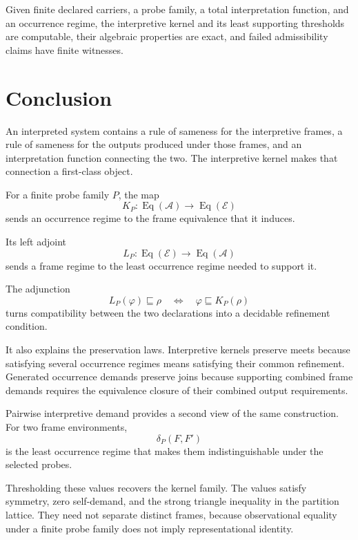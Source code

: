 \documentclass[11pt]{article}
\theoremstyle{plain}
\theoremstyle{definition}
\theoremstyle{remark}
\begin{document}
Given finite declared carriers, a probe family,
a total interpretation function,
and an occurrence regime,
the interpretive kernel
and its least supporting thresholds
are computable, their algebraic properties are exact,
and failed admissibility claims have finite witnesses.

\section{Conclusion}
\label{ik.sec.conclusion}

An interpreted system contains a rule of sameness for the interpretive frames,
a rule of sameness for the outputs produced under those frames,
and an interpretation function connecting the two.
The interpretive kernel makes that connection a first-class object.

For a finite probe family \(P\), the map
\[
  K_P:
  \operatorname{Eq}(\mathcal{A})
  \longrightarrow
  \operatorname{Eq}(\mathcal{E})
\]
sends an occurrence regime to the frame equivalence that it induces.

Its left adjoint
\[
  L_P:
  \operatorname{Eq}(\mathcal{E})
  \longrightarrow
  \operatorname{Eq}(\mathcal{A})
\]
sends a frame regime to the least occurrence regime needed to support it.

The adjunction
\[
  L_P(\varphi)
  \sqsubseteq
  \rho
  \quad\Longleftrightarrow\quad
  \varphi
  \sqsubseteq
  K_P(\rho)
\]
turns compatibility between the two declarations into a decidable refinement condition.

It also explains the preservation laws.
Interpretive kernels preserve meets because satisfying several occurrence regimes
means satisfying their common refinement.
Generated occurrence demands preserve joins
because supporting combined frame demands
requires the equivalence closure of their combined output requirements.

Pairwise interpretive demand provides a second view of the same construction.
For two frame environments,
\[
  \delta_P(F,F')
\]
is the least occurrence regime that makes them indistinguishable
under the selected probes.

Thresholding these values recovers the kernel family.
The values satisfy symmetry, zero self-demand,
and the strong triangle inequality in the partition lattice.
They need not separate distinct frames, because observational equality
under a finite probe family does not imply representational identity.
\end{document}
